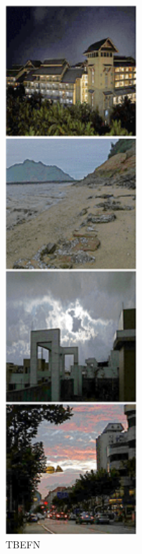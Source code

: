 \documentclass[CJK,aspectratio=169]{beamer}  %
\begin{document}
\begin{frame}
\begin{figure}
\begin{minipage}{.08\paperwidth}
			\label{fig: TBEFN}	
			\caption*{\tiny TBEFN}
		\end{minipage}
		\begin{minipage}{.08\paperwidth}
			\centering
			\setlength{\abovecaptionskip}{-0.45cm}
			\includegraphics[width=\linewidth]{picture/LLIE/LightingNet/ZERO-DCE}

\end{minipage}
\end{figure}
\end{frame}
\end{document}
